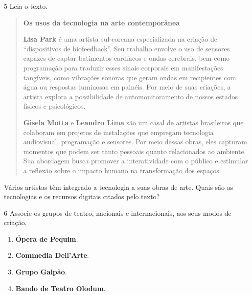 \num{5} Leia o texto.

\begin{quote}
\textbf{Os usos da tecnologia na arte contemporânea}

\textbf{Lisa Park} é uma artista sul-coreana especializada na criação de
``dispositivos de biofeedback''. Seu trabalho envolve o uso de 
sensores capazes de captar batimentos cardíacos e ondas cerebrais, 
bem como programação para traduzir esses sinais corporais em 
manifestações tangíveis, como vibrações sonoras que geram ondas 
em recipientes com água ou respostas luminosas em painéis. Por meio 
de suas criações, a artista explora a possibilidade de automonitoramento 
de nossos estados físicos e psicológicos.

\textbf{Gisela Motta} e \textbf{Leandro Lima} são um casal de artistas brasileiros que 
colaboram em projetos de instalações que empregam tecnologia audiovisual, 
programação e sensores. Por meio dessas obras, eles capturam momentos 
que podem ser tanto pessoais quanto relacionados ao ambiente. Sua abordagem 
busca promover a interatividade com o público e estimular a reflexão sobre 
o impacto humano na transformação dos espaços.

\end{quote}

Vários artistas têm integrado a tecnologia a suas obras de arte. Quais
são as tecnologias e os recursos digitais citados pelo texto?


\num{6} Associe os grupos de teatro, nacionais e internacionais, aos seus modos de criação.

\begin{enumerate}
\item \textbf{Ópera de Pequim}.

\item \textbf{Commedia Dell'Arte}.

\item \textbf{Grupo Galpão}.

\item \textbf{Bando de Teatro Olodum}.
\end{enumerate}

